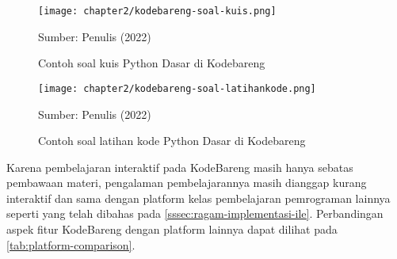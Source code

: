 \begin{figure}[!h]
  \centering
  \texttt{[image: chapter2/kodebareng-soal-kuis.png]}
  \caption{Contoh soal kuis Python Dasar di Kodebareng}\label{fig:kodebareng-soal-kuis}
  Sumber: Penulis (2022)
\end{figure}

\begin{figure}[!h]
  \centering
  \texttt{[image: chapter2/kodebareng-soal-latihankode.png]}
  \caption{Contoh soal latihan kode Python Dasar di Kodebareng}\label{fig:kodebareng-soal-latihankode}
  Sumber: Penulis (2022)
\end{figure}

Karena pembelajaran interaktif pada KodeBareng masih hanya sebatas pembawaan materi, pengalaman pembelajarannya masih dianggap kurang interaktif dan sama dengan platform kelas pembelajaran pemrograman lainnya seperti yang telah dibahas pada \autoref{sssec:ragam-implementasi-ile}. Perbandingan aspek fitur KodeBareng dengan platform lainnya dapat dilihat pada \autoref{tab:platform-comparison}.


